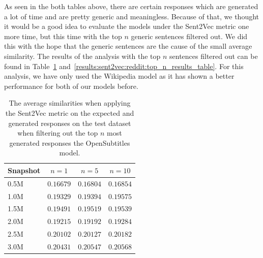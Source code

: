 As seen in the both tables above, there are certain responses which are generated a lot of time and are pretty generic and meaningless. Because of that, we thought it would be a good idea to evaluate the models under the Sent2Vec metric one more time, but this time with the top $n$ generic sentences filtered out. We did this with the hope that the generic sentences are the cause of the small average similarity. The results of the analysis with the top $n$ sentences filtered out can be found in Table~\ref{results:sent2vec:opensubtitles:top_n_results_table} and~\ref{results:sent2vec:reddit:top_n_results_table}. For this analysis, we have only used the Wikipedia model as it has shown a better performance for both of our models before.
\\
\begin{table}[H]
	\centering
	\begin{adjustbox}{max width=\textwidth}
		\begin{tabular}{lccc}
			\toprule
			Snapshot & $n = 1$ & $n = 5$ & $n = 10$\\
			\midrule
			0.5M & $0.16679$ & $0.16804$ & $0.16854$\\
			1.0M & $0.19329$ & $0.19394$ & $0.19575$\\
			1.5M & $0.19491$ & $0.19519$ & $0.19539$\\
			2.0M & $0.19215$ & $0.19192$ & $0.19284$\\
			2.5M & $0.20102$ & $0.20127$ & $0.20182$\\
			3.0M & $0.20431$ & $0.20547$ & $0.20568$\\
			\bottomrule
		\end{tabular}
	\end{adjustbox}
	\caption{The average similarities when applying the Sent2Vec metric on the expected and generated responses on the test dataset when filtering out the top $n$ most generated responses the OpenSubtitles model.}
	\label{results:sent2vec:opensubtitles:top_n_results_table}
\end{table}

